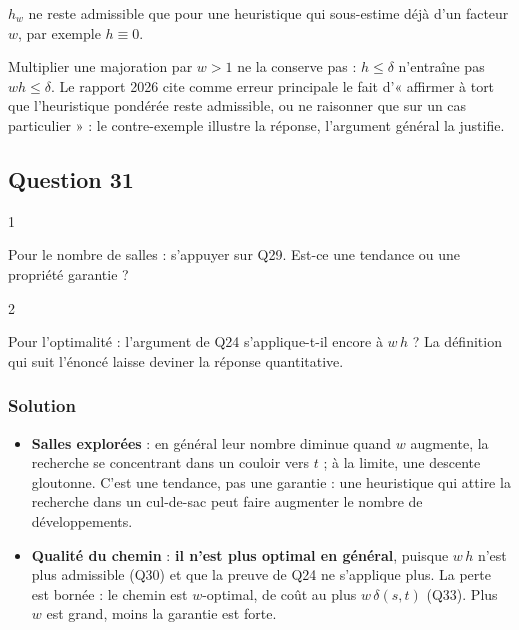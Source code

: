 \documentclass[11pt,a4paper]{article}
\providecommand{\tightlist}{\setlength{\itemsep}{0pt}\setlength{\parskip}{0pt}}
\begin{document}
\(h_w\) ne reste admissible que pour une heuristique qui sous-estime déjà d'un facteur \(w\), par exemple \(h \equiv 0\).

\begin{piege}

Multiplier une majoration par \(w > 1\) ne la conserve pas : \(h \le \delta\) n'entraîne pas \(w h \le \delta\). Le rapport 2026 cite comme erreur principale le fait d'« affirmer à tort que l'heuristique pondérée reste admissible, ou ne raisonner que sur un cas particulier » : le contre-exemple illustre la réponse, l'argument général la justifie.

\end{piege}

\hypertarget{question-31}{%
\subsection{Question 31}\label{question-31}}

\begin{indication}{1}

Pour le nombre de salles : s'appuyer sur Q29. Est-ce une tendance ou une propriété garantie ?

\end{indication}

\begin{indication}{2}

Pour l'optimalité : l'argument de Q24 s'applique-t-il encore à \(w\,h\) ? La définition qui suit l'énoncé laisse deviner la réponse quantitative.

\end{indication}

\hypertarget{solution-30}{%
\subsubsection{Solution}\label{solution-30}}

\begin{itemize}
\tightlist
\item
  \textbf{Salles explorées} : en général leur nombre diminue quand \(w\) augmente, la recherche se concentrant dans un couloir vers \(t\) ; à la limite, une descente gloutonne. C'est une tendance, pas une garantie : une heuristique qui attire la recherche dans un cul-de-sac peut faire augmenter le nombre de développements.
\item
  \textbf{Qualité du chemin} : \textbf{il n'est plus optimal en général}, puisque \(w\,h\) n'est plus admissible (Q30) et que la preuve de Q24 ne s'applique plus. La perte est bornée : le chemin est \(w\)-optimal, de coût au plus \(w\,\delta(s,t)\) (Q33). Plus \(w\) est grand, moins la garantie est forte.
\end{itemize}
\end{document}

